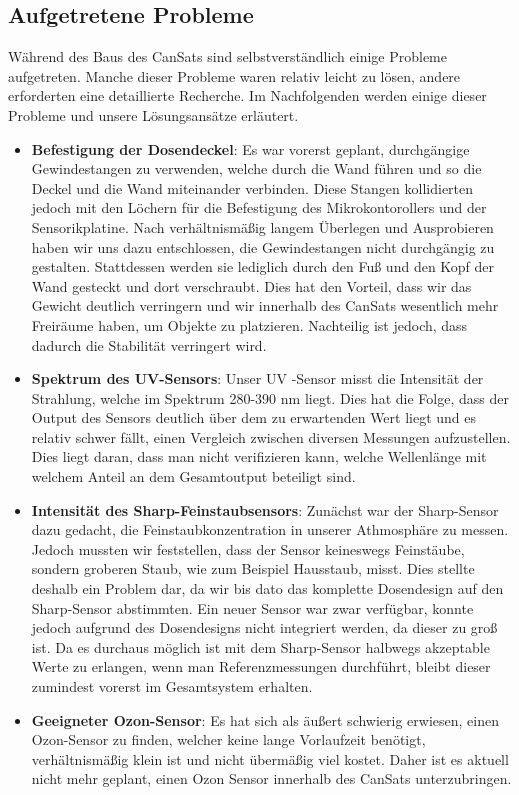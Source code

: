\subsection{Aufgetretene Probleme}
Während des Baus des CanSats sind selbstverständlich einige Probleme aufgetreten. Manche dieser Probleme waren relativ leicht zu lösen, andere erforderten eine detaillierte Recherche. Im Nachfolgenden werden einige dieser Probleme und unsere Lösungsansätze erläutert.

\begin{itemize}
	\item \textbf{Befestigung der Dosendeckel}: Es war vorerst geplant, durchgängige Gewindestangen zu verwenden, welche durch die Wand führen und so die Deckel und die Wand miteinander verbinden. Diese Stangen kollidierten jedoch mit den Löchern für die Befestigung des Mikrokontorollers und der Sensorikplatine. Nach verhältnismäßig langem Überlegen und Ausprobieren haben wir uns dazu entschlossen, die Gewindestangen nicht durchgängig zu gestalten. Stattdessen werden sie lediglich durch den Fuß und den Kopf der Wand gesteckt und dort verschraubt. Dies hat den Vorteil, dass wir das Gewicht deutlich verringern und wir innerhalb des CanSats wesentlich mehr Freiräume haben, um Objekte zu platzieren. Nachteilig ist jedoch, dass dadurch die Stabilität verringert wird.
	\item \textbf{Spektrum des UV-Sensors}: Unser UV -Sensor misst die Intensität der Strahlung, welche im Spektrum 280-390 nm liegt. Dies hat die Folge, dass der Output des Sensors deutlich über dem zu erwartenden Wert liegt und es relativ schwer fällt, einen Vergleich zwischen diversen Messungen aufzustellen. Dies liegt daran, dass man nicht verifizieren kann, welche Wellenlänge mit welchem Anteil an dem Gesamtoutput beteiligt sind.
	\item \textbf{Intensität des Sharp-Feinstaubsensors}: Zunächst war der Sharp-Sensor dazu gedacht, die Feinstaubkonzentration in unserer Athmosphäre zu messen. Jedoch mussten wir feststellen, dass der Sensor keineswegs Feinstäube, sondern groberen Staub, wie zum Beispiel Hausstaub, misst. Dies stellte deshalb ein Problem dar, da wir bis dato das komplette Dosendesign auf den Sharp-Sensor abstimmten. Ein neuer Sensor war zwar verfügbar, konnte jedoch aufgrund des Dosendesigns nicht integriert werden, da dieser zu groß ist. Da es durchaus möglich ist mit dem Sharp-Sensor halbwegs akzeptable Werte zu erlangen, wenn man Referenzmessungen durchführt, bleibt dieser zumindest vorerst im Gesamtsystem erhalten.
	\item \textbf{Geeigneter Ozon-Sensor}: Es hat sich als äußert schwierig erwiesen, einen Ozon-Sensor zu finden, welcher keine lange Vorlaufzeit benötigt, verhältnismäßig klein ist und nicht übermäßig viel kostet. Daher ist es aktuell nicht mehr geplant, einen Ozon Sensor innerhalb des CanSats unterzubringen.

\end{itemize}
